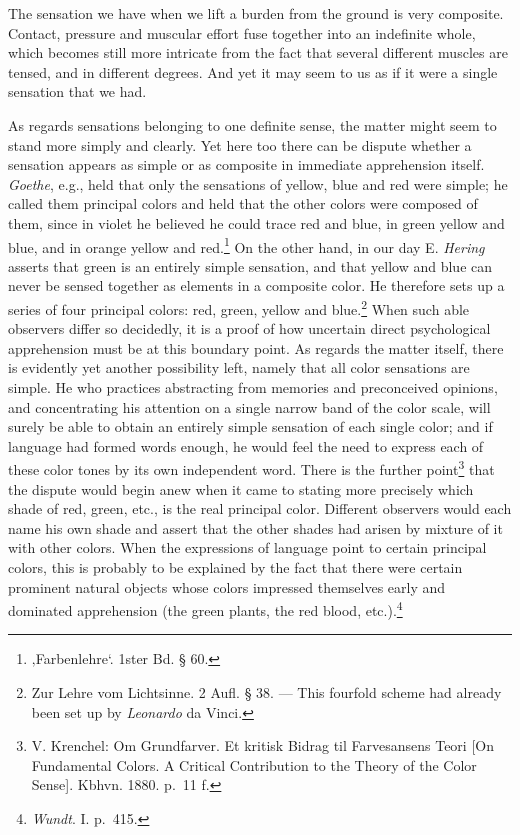 \documentclass[12pt,a4paper]{book}
\newcommand{\opage}[1]{\marginnote{\footnotesize\textit{[#1]}}}
\begin{document}
The sensation we have when we lift a burden from the ground is very
composite. Contact, pressure and muscular effort fuse together into an
indefinite whole, which becomes still more intricate from the fact that
several different muscles are tensed, and in different degrees. And yet
it may seem to us as if it were a single sensation that we had.

As regards sensations belonging to one definite sense, the matter might
seem to stand more simply and clearly. Yet here too there can be dispute
whether a sensation appears as simple or as composite in immediate
apprehension itself. \emph{Goethe}, e.g., held that only the sensations
of yellow, blue and red were simple; he called them principal colors and
held that the other colors were composed of them, since in violet he
believed he could trace red and blue, in green yellow and blue,
and in orange yellow and red.\footnote{‚Farbenlehre‘. 1ster Bd.
§ 60.} On the other hand, in our day E. \emph{Hering} asserts that
green is an entirely simple sensation, and that yellow and blue can
never be sensed together as
\opage{123}elements in a composite color. He therefore sets up a series
of four principal colors: red, green, yellow and blue.\footnote{Zur
Lehre vom Lichtsinne. 2 Aufl. § 38. --- This fourfold scheme had already
been set up by \emph{Leonardo} da Vinci.} When such able observers
differ so decidedly, it is a proof of how uncertain direct
psychological apprehension must be at this boundary point. As regards
the matter itself, there is evidently yet another possibility left,
namely that all color sensations are simple. He who practices
abstracting from memories and preconceived opinions, and concentrating
his attention on a single narrow band of the color scale, will surely be
able to obtain an entirely simple sensation of each single color; and if
language had formed words enough, he would feel the need to express each
of these color tones by its own independent word. There is the further
point\footnote{V. Krenchel: Om Grundfarver. Et kritisk Bidrag til
Farvesansens Teori [On Fundamental Colors. A Critical Contribution to
the Theory of the Color Sense]. Kbhvn. 1880. p.~11 f.} that the dispute
would begin anew when it came to stating more precisely which shade of
red, green, etc., is the real principal color. Different observers would
each name his own shade and assert that the other shades had arisen by
mixture of it with other colors. When the expressions of language point
to certain principal colors, this is probably to be explained by the
fact that there were certain prominent natural objects whose colors
impressed themselves early and dominated apprehension (the green plants,
the red blood,
etc.).\footnote{\emph{Wundt}. I. p.~415.}
\end{document}
